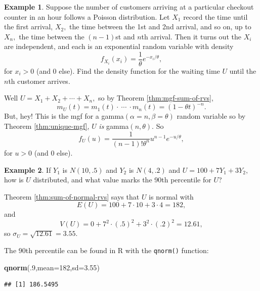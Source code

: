 \documentclass[
]{book}
\newenvironment{Shaded}{\begin{snugshade}}{\end{snugshade}}
\newcommand{\AttributeTok}[1]{\textcolor[rgb]{0.13,0.29,0.53}{#1}}
\newcommand{\DecValTok}[1]{\textcolor[rgb]{0.00,0.00,0.81}{#1}}
\newcommand{\FloatTok}[1]{\textcolor[rgb]{0.00,0.00,0.81}{#1}}
\newcommand{\FunctionTok}[1]{\textcolor[rgb]{0.13,0.29,0.53}{\textbf{#1}}}
\newcommand{\NormalTok}[1]{#1}
\theoremstyle{definition}
\theoremstyle{definition}
\newtheorem{example}{Example}[chapter]
\theoremstyle{definition}
\theoremstyle{definition}
\theoremstyle{remark}
\begin{document}
\begin{example}
Suppose the number of customers arriving at a particular checkout counter in an hour follows a Poisson distribution. Let \(X_1\) record the time until the first arrival, \(X_2,\) the time between the 1st and 2nd arrival, and so on, up to \(X_n,\) the time between the \((n-1)\)st and \(n\)th arrival. Then it turns out the \(X_i\) are independent, and each is an exponential random variable with density \[f_{X_i}(x_i) = \frac{1}{\theta}e^{-x_i/\theta},\] for \(x_i > 0\) (and 0 else).
Find the density function for the waiting time \(U\) until the \(n\)th customer arrives.

Well \(U = X_1 + X_2 + \cdots + X_n,\) so by Theorem \ref{thm:mgf-sum-of-rvs}, \[m_U(t) = m_1(t)\cdot ~\cdots~ \cdot m_n(t) = (1-\theta t)^{-n}.\]
But, hey! This is the mgf for a gamma\((\alpha = n, \beta = \theta)\) random variable so by Theorem \ref{thm:unique-mgf}, \(U\) \emph{is} gamma\((n,\theta)\). So \[f_U(u) = \frac{1}{(n-1)!\theta^n}u^{n-1}e^{-u/\theta},\] for \(u > 0\) (and 0 else).
\end{example}

\begin{example}

If \(Y_1\) is \(N(10,.5)\) and \(Y_2\) is \(N(4,.2)\) and \(U = 100 + 7Y_1 + 3Y_2,\) how is \(U\) distributed, and what value marks the 90th percentile for \(U\)?

Theorem \ref{thm:sum-of-normal-rvs} says that \(U\) is normal with \[E(U) = 100 + 7 \cdot 10 + 3 \cdot 4 = 182,\] and \[V(U) = 0 + 7^2\cdot (.5)^2 + 3^2\cdot(.2)^2 = 12.61,\] so \(\sigma_U = \sqrt{12.61} = 3.55.\)

The 90th percentile can be found in R with the \texttt{qnorm()} function:

\begin{Shaded}
\begin{Highlighting}[]
\FunctionTok{qnorm}\NormalTok{(.}\DecValTok{9}\NormalTok{,}\AttributeTok{mean=}\DecValTok{182}\NormalTok{,}\AttributeTok{sd=}\FloatTok{3.55}\NormalTok{)}
\end{Highlighting}
\end{Shaded}

\begin{verbatim}
## [1] 186.5495
\end{verbatim}

\end{example}
\end{document}
